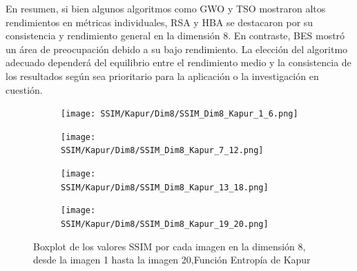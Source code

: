 \documentclass[conference]{IEEEtran}
\begin{document}
\noindent En resumen, si bien algunos algoritmos como GWO y TSO mostraron altos rendimientos en métricas individuales, RSA y HBA se destacaron por su consistencia y rendimiento general en la dimensión 8. En contraste, BES mostró un área de preocupación debido a su bajo rendimiento. La elección del algoritmo adecuado dependerá del equilibrio entre el rendimiento medio y la consistencia de los resultados según sea prioritario para la aplicación o la investigación en cuestión.
\begin{figure}
	\centering
	
	\begin{subfigure}{0.4\textwidth}
		\texttt{[image: SSIM/Kapur/Dim8/SSIM\_Dim8\_Kapur\_1\_6.png]}
	\end{subfigure}
	
	\begin{subfigure}{0.4\textwidth}
		\texttt{[image: SSIM/Kapur/Dim8/SSIM\_Dim8\_Kapur\_7\_12.png]}
	\end{subfigure}  
	\begin{subfigure}{0.4\textwidth}
		\texttt{[image: SSIM/Kapur/Dim8/SSIM\_Dim8\_Kapur\_13\_18.png]}
	\end{subfigure}   
	\begin{subfigure}{0.4\textwidth}
		\texttt{[image: SSIM/Kapur/Dim8/SSIM\_Dim8\_Kapur\_19\_20.png]}
		\vspace{-120pt} %
	\end{subfigure}
	\caption{Boxplot de los valores SSIM por cada imagen en la dimensión 8, desde la imagen 1 hasta la imagen 20,Función Entropía de Kapur}
	\label{fig:imagenes}    
\end{figure}
\end{document}
